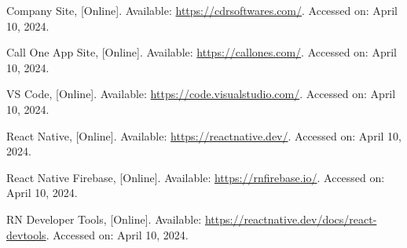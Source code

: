 \begin{thebibliography}{1}

    
    
    
    
    

    Company Site, [Online]. Available: \url{https://cdrsoftwares.com/}. Accessed on: April 10, 2024.

    Call One App Site, [Online]. Available: \url{https://callones.com/}. Accessed on: April 10, 2024.
    
    VS Code, [Online]. Available: \url{https://code.visualstudio.com/}. Accessed on: April 10, 2024.

    React Native, [Online]. Available: \url{https://reactnative.dev/}. Accessed on: April 10, 2024.

    React Native Firebase, [Online]. Available: \url{https://rnfirebase.io/}. Accessed on: April 10, 2024.

    RN Developer Tools, [Online]. Available: \url{https://reactnative.dev/docs/react-devtools}. Accessed on: April 10, 2024.


\end{thebibliography}
